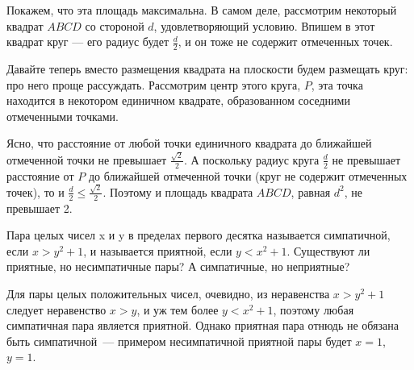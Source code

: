 \begin{itemize}
Покажем, что эта площадь максимальна.
В самом деле, рассмотрим некоторый квадрат $ABCD$ со стороной $d$, удовлетворяющий условию.
Впишем в этот квадрат круг --- его радиус будет $\frac{d}{2}$, и он тоже не содержит
отмеченных точек. 

\begin{center}\end{center}

Давайте теперь вместо размещения квадрата на плоскости будем размещать круг:
про него проще рассуждать.
Рассмотрим центр этого круга, $P$, эта точка находится в некотором
единичном квадрате, образованном соседними отмеченными точками.

\begin{center}\end{center}

Ясно, что расстояние от любой точки единичного квадрата до ближайшей отмеченной 
точки не превышает $\frac{\sqrt{2}}{2}$. А поскольку радиус круга $\frac{d}{2}$ не 
превышает расстояние от $P$ до ближайшей отмеченной точки (круг не содержит отмеченных точек), 
то и $\frac{d}{2} \le \frac{\sqrt{2}}{2}$.
Поэтому и площадь квадрата $ABCD$, равная $d^2$, не превышает 2.
\end{itemize}


\begin{itemize}
\itC Пара целых чисел x и y в пределах первого десятка называется симпатичной, если $x>y^2+1$, 
и называется  приятной, если $y<x^2+1$. Существуют ли приятные, но несимпатичные пары? 
А симпатичные, но неприятные?

\itr Для пары целых положительных чисел, очевидно, из неравенства
$x>y^2+1$ следует неравенство $x>y$, и уж тем более $y<x^2+1$,
поэтому любая симпатичная пара является приятной. Однако приятная пара отнюдь 
не обязана быть симпатичной~--- примером несимпатичной приятной пары будет
$x=1$, $y=1$.
\end{itemize}

